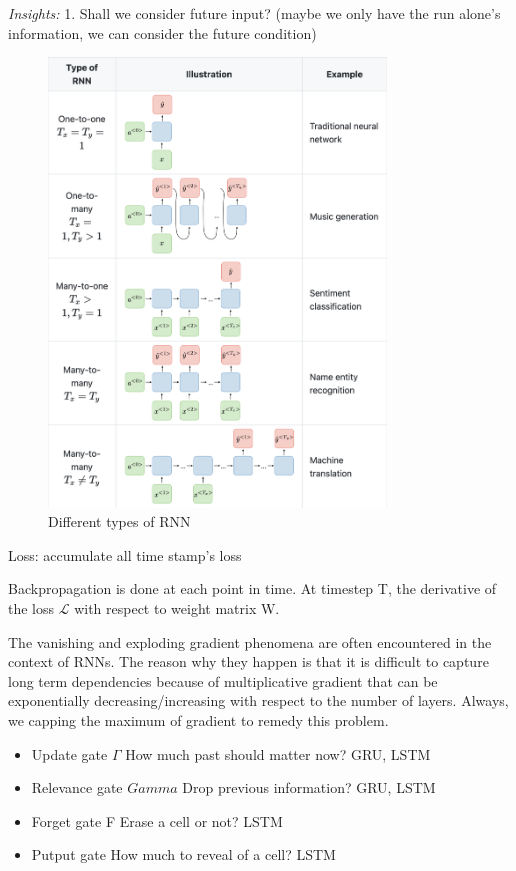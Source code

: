 \documentclass[UTF8]{article}
\begin{document}
\emph{Insights:} 1. Shall we consider future input? (maybe we only have the run alone's information, we can consider the future condition)

\begin{figure}[htbp]
\caption{Different types of RNN}
\centering
\includegraphics[width=0.8\textwidth]{stanford.edu__shervine_teaching_cs-230_cheatsheet-recurrent-neural-networks.png}
\end{figure}

Loss: accumulate all time stamp's loss

Backpropagation is done at each point in time. At timestep T, the derivative of the loss $\mathcal{L}$ with respect to weight matrix W.

The vanishing and exploding gradient phenomena are often encountered in the context of RNNs. The reason why they happen is that it is difficult to capture long term dependencies because of multiplicative gradient that can be exponentially decreasing/increasing with respect to the number of layers. Always, we capping the maximum of gradient to remedy this problem.

\begin{itemize}
    \item Update gate $\Gamma$ How much past should matter now?	GRU, LSTM
    \item Relevance gate $Gamma$ Drop previous information?	GRU, LSTM
    \item Forget gate F Erase a cell or not?	LSTM
    \item Putput gate How much to reveal of a cell?	LSTM
\end{itemize}
\end{document}
